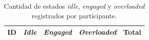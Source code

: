 \begin{table}[H]
    \centering
    \caption{Cantidad de estados \textit{idle}, \textit{engaged} y \textit{overloaded} registrados por participante.}
    \label{tab:cantidadEstados}

    \renewcommand{\arraystretch}{1.3}
    \setlength{\tabcolsep}{4pt}

    \begin{tabularx}{\textwidth}{
        |>{\centering\arraybackslash}X
        |>{\centering\arraybackslash}X
        |>{\centering\arraybackslash}X
        |>{\centering\arraybackslash}X
        |>{\centering\arraybackslash}X|
    }
        \hline
        \textbf{ID} &
        \textbf{\textit{Idle}} &
        \textbf{\textit{Engaged}} &
        \textbf{\textit{Overloaded}} &
        \textbf{Total} \\ \hline


\end{tabularx}
\end{table}
